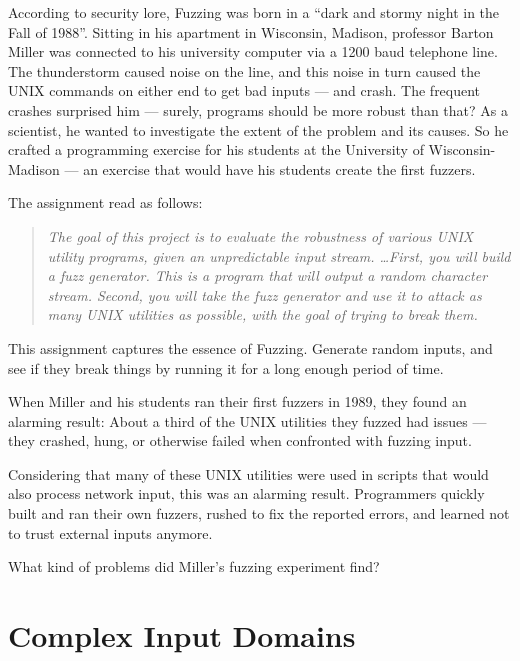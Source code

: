 According to security lore, Fuzzing was born in a ``dark and stormy night in the
Fall of 1988''. Sitting in his apartment in Wisconsin, Madison, professor Barton
Miller was connected to his university computer via a 1200 baud telephone line.
The thunderstorm caused noise on the line, and this noise in turn caused the
UNIX commands on either end to get bad inputs --- and crash. The frequent crashes
surprised him --- surely, programs should be more robust than that? As a
scientist, he wanted to investigate the extent of the problem and its causes. So
he crafted a programming exercise for his students at the University of
Wisconsin-Madison --- an exercise that would have his students create the first
fuzzers.

The assignment read as follows:

\begin{quote}
    {\it The goal of this project is to evaluate the robustness of various UNIX
    utility programs, given an unpredictable input stream. \dots First, you will
    build a fuzz generator. This is a program that will output a random character
    stream. Second, you will take the fuzz generator and use it to attack as many
    UNIX utilities as possible, with the goal of trying to break them.}
\end{quote}

This assignment captures the essence of Fuzzing. Generate random inputs, and see
if they break things by running it for a long enough period of time.

When Miller and his students ran their first fuzzers in 1989, they found an
alarming result: About a third of the UNIX utilities they fuzzed had issues ---
they crashed, hung, or otherwise failed when confronted with fuzzing input.

Considering that many of these UNIX utilities were used in scripts that would
also process network input, this was an alarming result. Programmers quickly
built and ran their own fuzzers, rushed to fix the reported errors, and learned
not to trust external inputs anymore.

What kind of problems did Miller's fuzzing experiment find?




\section{Complex Input Domains}







